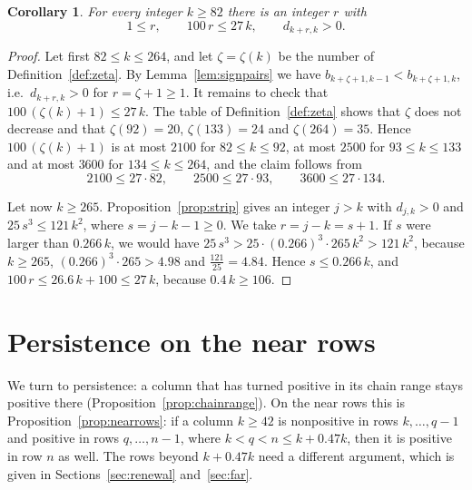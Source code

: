 \documentclass{amsart}
\makeatletter
\newtheorem{corollary}[theorem]{Corollary}
\theoremstyle{definition}
\theoremstyle{remark}
\numberwithin{equation}{section}
\def\subsection{\@startsection{subsection}{2}\z@{.5\linespacing\@plus.7\linespacing}{-.5em}{\normalfont\bfseries\boldmath}}
\makeatother
\begin{document}
\begin{corollary}\label{cor:earlypositive}
For every integer $k\ge 82$ there is an integer $r$ with
\[
1\le r,\qquad 100\,r\le 27\,k,\qquad d_{k+r,k}>0.
\]
\end{corollary}

\begin{proof}
Let first $82\le k\le 264$, and let $\zeta=\zeta(k)$ be the number of Definition~\ref{def:zeta}. By Lemma~\ref{lem:signpairs} we have $b_{k+\zeta+1,k-1}<b_{k+\zeta+1,k}$, i.e.\ $d_{k+r,k}>0$ for $r=\zeta+1\ge 1$. It remains to check that $100\,(\zeta(k)+1)\le 27\,k$. The table of Definition~\ref{def:zeta} shows that $\zeta$ does not decrease and that $\zeta(92)=20$, $\zeta(133)=24$ and $\zeta(264)=35$. Hence $100\,(\zeta(k)+1)$ is at most $2100$ for $82\le k\le 92$, at most $2500$ for $93\le k\le 133$ and at most $3600$ for $134\le k\le 264$, and the claim follows from
\[
2100\le 27\cdot 82,\qquad 2500\le 27\cdot 93,\qquad 3600\le 27\cdot 134.
\]

Let now $k\ge 265$. Proposition~\ref{prop:strip} gives an integer $j>k$ with $d_{j,k}>0$ and $25\,s^3\le 121\,k^2$, where $s=j-k-1\ge 0$. We take $r=j-k=s+1$. If $s$ were larger than $0.266\,k$, we would have $25\,s^3>25\cdot(0.266)^3\cdot 265\,k^2>121\,k^2$, because $k\ge 265$, $(0.266)^3\cdot 265>4.98$ and $\frac{121}{25}=4.84$. Hence $s\le 0.266\,k$, and $100\,r\le 26.6\,k+100\le 27\,k$, because $0.4\,k\ge 106$.
\end{proof}

\section{Persistence on the near rows}\label{sec:near}
We turn to persistence: a column that has turned positive in its chain range stays positive there (Proposition~\ref{prop:chainrange}). On the near rows this is Proposition~\ref{prop:nearrows}: if a column $k\ge 42$ is nonpositive in rows $k,\dots,q-1$ and positive in rows $q,\dots,n-1$, where $k<q<n\le k+0.47k$, then it is positive in row $n$ as well. The rows beyond $k+0.47k$ need a different argument, which is given in Sections~\ref{sec:renewal} and~\ref{sec:far}.

\subsection{A lemma on two rows}\label{subsec:near-twopoint}
\end{document}
